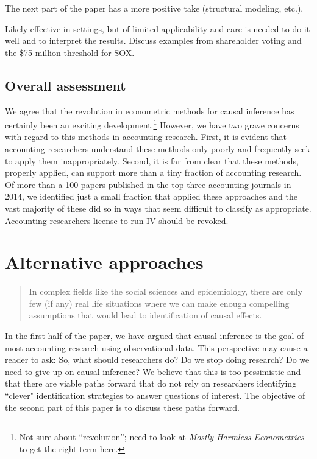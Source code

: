 \documentclass[11pt]{amsart}
\begin{document}
The next part of the paper has a more positive take (structural modeling, etc.).

Likely effective in settings, but of limited applicability and care is needed to do it well and to interpret the results. Discuss examples from shareholder voting and the \$75 million threshold for SOX.

\subsection{Overall assessment}

We agree that the revolution in econometric methods for causal inference has certainly been an exciting development.\footnote{Not sure about ``revolution''; need to look at \emph{Mostly Harmless Econometrics} to get the right term here.} However, we have two grave concerns with regard to this methods in accounting research. First, it is evident that accounting researchers understand these methods only poorly and frequently seek to apply them inappropriately. Second,  it is far from clear that these methods, properly applied, can support more than a tiny fraction of accounting research. Of more than a 100 papers published in the top three accounting journals in 2014, we identified just a small fraction that applied these approaches and the vast majority of these did so in ways that seem difficult to classify as appropriate. Accounting researchers license to run IV should be revoked.

\section{Alternative approaches}

\begin{quotation}
In complex fields like the social sciences and epidemiology, there are only few (if any) real life situations where we can make enough compelling assumptions that would lead to identification of causal effects.
\end{quotation}

In the first half of the paper, we have argued that causal inference is the goal of most accounting research using observational data.
This perspective may cause a reader to ask: So, what should researchers do? Do we stop doing research? Do we need to give up on causal inference? 
We believe that this is too pessimistic and that there are viable paths forward that do not rely on researchers identifying ``clever" identification strategies to answer questions of interest.
The objective of the second part of this paper is to discuss these paths forward.
\end{document}
